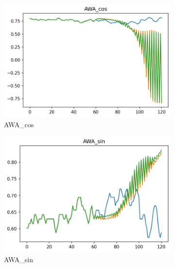 \documentclass[12pt,twoside]{report}
\begin{document}
\begin{figure}[h]
     \centering
     \begin{subfigure}[b]{0.32\textwidth}
         \centering
         \includegraphics[width=\textwidth]{figures/prediction-plots-compared/AWA_cos.png}
         \caption{AWA\_cos}
     \end{subfigure}
     \begin{subfigure}[b]{0.32\textwidth}
         \centering
         \includegraphics[width=\textwidth]{figures/prediction-plots-compared/AWA_sin.png}
         \caption{AWA\_sin}
     \end{subfigure}
     \begin{subfigure}[b]{0.32\textwidth}
         \centering

\end{subfigure}
\end{figure}
\end{document}
